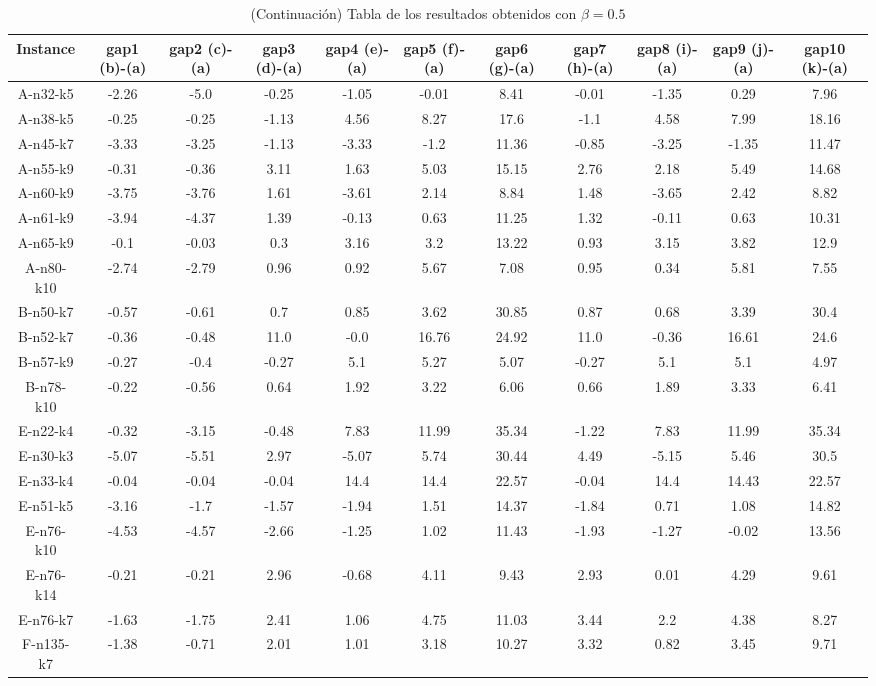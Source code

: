 \documentclass[11pt]{article} %
\begin{document}
\begin{enumerate}
\begin{landscape}
\begin{table}[p]
\centering
\begin{small}
\caption{(Continuación) Tabla de los resultados obtenidos con $\beta = 0.5$}
\begin{tabular}{ccccccccccc}
\toprule
Instance & gap1 (b)-(a) &          gap2 (c)-(a) &       gap3 (d)-(a) &       gap4 (e)-(a) &       gap5 (f)-(a) &       gap6 (g)-(a) &       gap7 (h)-(a) &       gap8 (i)-(a) &       gap9 (j)-(a) &      gap10 (k)-(a) \\
\midrule
A-n32-k5&-2.26&-5.0&-0.25&-1.05&-0.01&8.41&-0.01&-1.35&0.29&7.96\\
A-n38-k5&-0.25&-0.25&-1.13&4.56&8.27&17.6&-1.1&4.58&7.99&18.16\\
A-n45-k7&-3.33&-3.25&-1.13&-3.33&-1.2&11.36&-0.85&-3.25&-1.35&11.47\\
A-n55-k9&-0.31&-0.36&3.11&1.63&5.03&15.15&2.76&2.18&5.49&14.68\\
A-n60-k9&-3.75&-3.76&1.61&-3.61&2.14&8.84&1.48&-3.65&2.42&8.82\\
A-n61-k9&-3.94&-4.37&1.39&-0.13&0.63&11.25&1.32&-0.11&0.63&10.31\\
A-n65-k9&-0.1&-0.03&0.3&3.16&3.2&13.22&0.93&3.15&3.82&12.9\\
A-n80-k10&-2.74&-2.79&0.96&0.92&5.67&7.08&0.95&0.34&5.81&7.55\\
B-n50-k7&-0.57&-0.61&0.7&0.85&3.62&30.85&0.87&0.68&3.39&30.4\\
B-n52-k7&-0.36&-0.48&11.0&-0.0&16.76&24.92&11.0&-0.36&16.61&24.6\\
B-n57-k9&-0.27&-0.4&-0.27&5.1&5.27&5.07&-0.27&5.1&5.1&4.97\\
B-n78-k10&-0.22&-0.56&0.64&1.92&3.22&6.06&0.66&1.89&3.33&6.41\\
E-n22-k4&-0.32&-3.15&-0.48&7.83&11.99&35.34&-1.22&7.83&11.99&35.34\\
E-n30-k3&-5.07&-5.51&2.97&-5.07&5.74&30.44&4.49&-5.15&5.46&30.5\\
E-n33-k4&-0.04&-0.04&-0.04&14.4&14.4&22.57&-0.04&14.4&14.43&22.57\\
E-n51-k5&-3.16&-1.7&-1.57&-1.94&1.51&14.37&-1.84&0.71&1.08&14.82\\
E-n76-k10&-4.53&-4.57&-2.66&-1.25&1.02&11.43&-1.93&-1.27&-0.02&13.56\\
E-n76-k14&-0.21&-0.21&2.96&-0.68&4.11&9.43&2.93&0.01&4.29&9.61\\
E-n76-k7&-1.63&-1.75&2.41&1.06&4.75&11.03&3.44&2.2&4.38&8.27\\
F-n135-k7&-1.38&-0.71&2.01&1.01&3.18&10.27&3.32&0.82&3.45&9.71\\

\end{tabular}
\end{small}
\end{table}
\end{landscape}
\end{enumerate}
\end{document}
